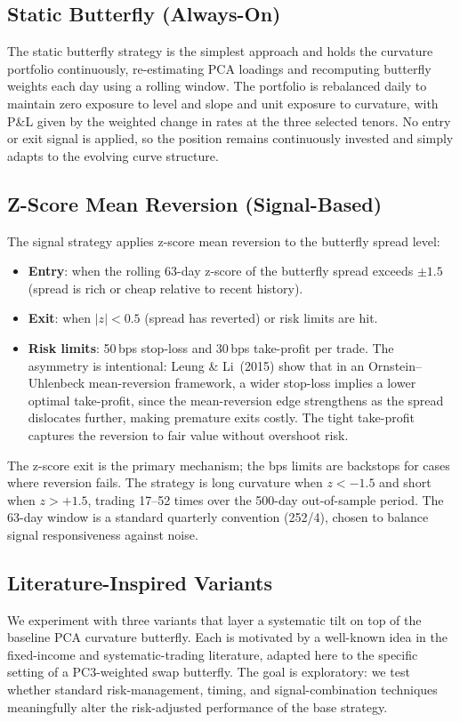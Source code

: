 \documentclass[11pt,a4paper]{article}
\begin{document}
\subsection{Static Butterfly (Always-On)}
The static butterfly strategy is the simplest approach and holds the curvature portfolio continuously, re-estimating PCA loadings and recomputing butterfly weights each day using a rolling window. The portfolio is rebalanced daily to maintain zero exposure to level and slope and unit exposure to curvature, with P\&L given by the weighted change in rates at the three selected tenors. No entry or exit signal is applied, so the position remains continuously invested and simply adapts to the evolving curve structure.

\subsection{Z-Score Mean Reversion (Signal-Based)}
The signal strategy applies z-score mean reversion to the butterfly
spread level:
\begin{itemize}
  \item \textbf{Entry}: when the rolling 63-day z-score of the
        butterfly spread exceeds $\pm 1.5$ (spread is rich or cheap
        relative to recent history).
  \item \textbf{Exit}: when $|z| < 0.5$ (spread has reverted) or
        risk limits are hit.
  \item \textbf{Risk limits}: 50\,bps stop-loss and 30\,bps
        take-profit per trade.  The asymmetry is intentional: Leung \&
        Li~(2015) show that in an Ornstein--Uhlenbeck mean-reversion
        framework, a wider stop-loss implies a lower optimal take-profit,
        since the mean-reversion edge strengthens as the spread
        dislocates further, making premature exits costly.  The tight
        take-profit captures the reversion to fair value without
        overshoot risk.
\end{itemize}
The z-score exit is the primary mechanism; the bps limits are backstops
for cases where reversion fails.  The strategy is long curvature when
$z < -1.5$ and short when $z > +1.5$, trading 17--52 times over the
500-day out-of-sample period.  The 63-day window is a standard
quarterly convention (252/4), chosen to balance signal responsiveness
against noise.

\subsection{Literature-Inspired Variants}
We experiment with three variants that layer a systematic tilt on top of the
baseline PCA curvature butterfly.  Each is motivated by a well-known idea in
the fixed-income and systematic-trading literature, adapted here to the
specific setting of a PC3-weighted swap butterfly.  The goal is exploratory:
we test whether standard risk-management, timing, and signal-combination
techniques meaningfully alter the risk-adjusted performance of the base
strategy.
\end{document}
